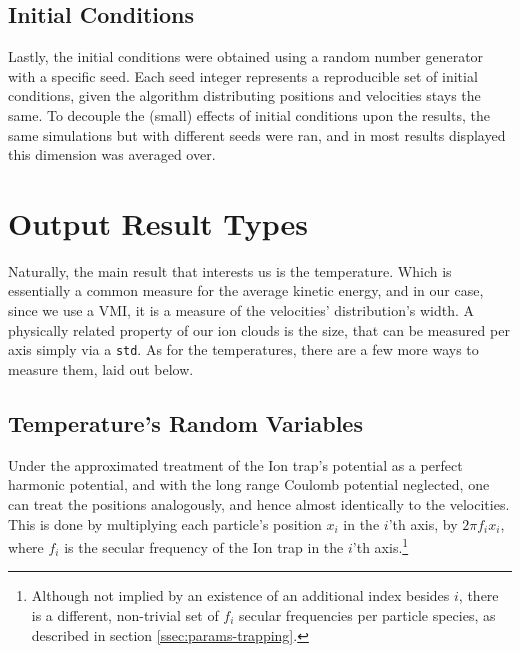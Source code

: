 \subsection{Initial Conditions}

Lastly, the initial conditions were obtained using a random number generator with a specific seed. Each seed integer represents a reproducible set of initial conditions, given the algorithm distributing positions and velocities stays the same. To decouple the (small) effects of initial conditions upon the results, the same simulations but with different seeds were ran, and in most results displayed this dimension was averaged over.


\section{Output Result Types}

Naturally, the main result that interests us is the temperature. Which is essentially a common measure for the average kinetic energy, and in our case, since we use a VMI, it is a measure of the velocities' distribution's width. A physically related property of our ion clouds is the size, that can be measured per axis simply via a \texttt{std}. As for the temperatures, there are a few more ways to measure them, laid out below. 

\subsection{Temperature's Random Variables}

Under the approximated treatment of the Ion trap's potential as a perfect harmonic potential, and with the long range Coulomb potential neglected, one can treat the positions analogously, and hence almost identically to the velocities. This is done by multiplying each particle's position $x_i$ in the $i$'th axis, by $2\pi f_i x_i$, where $f_i$ is the secular frequency of the Ion trap in the $i$'th axis.\footnote{Although not implied by an existence of an additional index besides $i$, there is a different, non-trivial set of $f_i$ secular frequencies per particle species, as described in section \ref{ssec:params-trapping}.}

